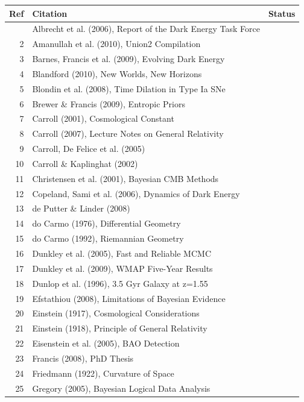 \documentclass{article}
\newcommand{\done}{\textcolor{green!60!black}{\ding{51}}}
\begin{document}
\begin{longtable}{|r|p{8cm}|c|}
\hline
Ref & Citation & Status \\
\hline
\endhead
\hline
\endfoot
1 & Albrecht et al. (2006), Report of the Dark Energy Task Force & \done \\
2 & Amanullah et al. (2010), Union2 Compilation & \done \\
3 & Barnes, Francis et al. (2009), Evolving Dark Energy & \done \\
4 & Blandford (2010), New Worlds, New Horizons & \done \\
5 & Blondin et al. (2008), Time Dilation in Type Ia SNe & \done \\
6 & Brewer \& Francis (2009), Entropic Priors & \done \\
7 & Carroll (2001), Cosmological Constant & \done \\
8 & Carroll (2007), Lecture Notes on General Relativity & \done \\
9 & Carroll, De Felice et al. (2005) & \done \\
10 & Carroll \& Kaplinghat (2002) & \done \\
11 & Christensen et al. (2001), Bayesian CMB Methods & \done \\
12 & Copeland, Sami et al. (2006), Dynamics of Dark Energy & \done \\
13 & de Putter \& Linder (2008) & \done \\
14 & do Carmo (1976), Differential Geometry & \done \\
15 & do Carmo (1992), Riemannian Geometry & \done \\
16 & Dunkley et al. (2005), Fast and Reliable MCMC & \done \\
17 & Dunkley et al. (2009), WMAP Five-Year Results & \done \\
18 & Dunlop et al. (1996), 3.5 Gyr Galaxy at z=1.55 & \done \\
19 & Efstathiou (2008), Limitations of Bayesian Evidence & \done \\
20 & Einstein (1917), Cosmological Considerations & \done \\
21 & Einstein (1918), Principle of General Relativity & \done \\
22 & Eisenstein et al. (2005), BAO Detection & \done \\
23 & Francis (2008), PhD Thesis & \done \\
24 & Friedmann (1922), Curvature of Space & \done \\
25 & Gregory (2005), Bayesian Logical Data Analysis & \done \\

\end{longtable}
\end{document}
